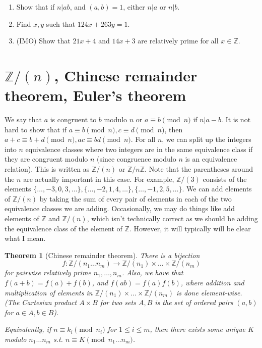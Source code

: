 \documentclass{article}
\theoremstyle{plain}
\newtheorem{theorem}{Theorem}
\numberwithin{equation}{section}
\begin{document}
\begin{enumerate}
\item Show that if $n|ab$, and $(a, b) = 1$, either $n|a$ or $n|b$.
\item Find $x, y$ such that $124x + 263y = 1$.
\item (IMO) Show that $21x + 4$ and $14x + 3$ are relatively prime for all $x\in\mathbb{Z}.$
\end{enumerate}

\section*{$\mathbb{Z}/(n)$, Chinese remainder theorem, Euler's theorem}

We say that $a$ is congruent to $b$ modulo $n$ or $a\equiv b\pmod{n}$ if $n|a - b$. It is not hard to show that if 
$a\equiv b\pmod{n}, c\equiv d\pmod{n}$, then $a + c\equiv b + d\pmod{n}, ac\equiv bd\pmod{n}.$ For all $n$, we can split 
up the integers into $n$ equivalence classes where two integers are in the same equivalence class if they are congruent
modulo $n$ (since congruence modulo $n$ is an equivalence relation). This is written as $\mathbb{Z}/(n)$ or $\mathbb{Z}/n\mathbb{Z}$.
Note that the parentheses around the $n$ are actually important in this case. For example, $\mathbb{Z}/(3)$ consists of 
the elements $\{\dots, -3, 0, 3, \dots\}, \{\dots, -2, 1, 4, \dots\}, \{\dots, -1, 2, 5, \dots\}$. We can add elements of 
$\mathbb{Z}/(n)$ by taking the sum of every pair of elements in each of the two equivalence classes we are adding. Occasionally, we 
may do things like add elements of $\mathbb{Z}$ and $\mathbb{Z}/(n)$, which isn't technically correct as we should be adding the 
equivalence class of the element of $\mathbb{Z}$. However, it will typically will be clear what I mean.

\begin{theorem}[Chinese remainder theorem]
There is a bijection $$f:\mathbb{Z}/(n_1\dots n_m)\rightarrow \mathbb{Z}/(n_1)\times\dots\times\mathbb{Z}/(n_m)$$ for pairwise 
relatively prime $n_1, \dots, n_m$. Also, we have that $f(a + b) = f(a) + f(b)$, and $f(ab) = f(a)f(b)$, where addition and
multiplication of elements in $\mathbb{Z}/(n_1)\times\dots\times\mathbb{Z}/(n_m)$ is done element-wise. 
(The Cartesian product $A\times B$ for two sets $A, B$ is the set of ordered pairs $(a, b)$ for $a\in A, b\in B$).

Equivalently, if $n\equiv k_i\pmod{n_i}$ for $1 \le i\le m$, then there exists some unique $K$ modulo $n_1\dots n_m$ s.t. 
$n\equiv K\pmod{n_1\dots n_m}$.
\end{theorem}
\end{document}
